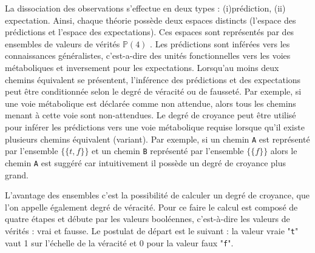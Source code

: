 \begin{refsegment}
La dissociation des observations s'effectue en deux types : (i)prédiction, (ii) expectation. Ainsi, chaque théorie possède deux espaces distincts (l'espace des prédictions et l'espace des expectations). Ces espaces sont représentés par des ensembles de valeurs de vérités $\mathbb{P}(4)$ . Les prédictions sont inférées vers les connaissances généralistes, c'est-a-dire des unités fonctionnelles vers les voies métaboliques et inversement pour les expectations. Lorsqu'au moins deux chemins équivalent se présentent, l'inférence des prédictions et des expectations peut être conditionnée selon le degré de véracité ou de fausseté. Par exemple, si une voie métabolique est déclarée comme non attendue, alors tous les chemins menant à cette voie sont non-attendues. Le degré de croyance peut être utilisé pour inférer les prédictions vers une voie métabolique requise lorsque qu'il existe plusieurs chemins équivalent (variant). Par exemple, si un chemin \texttt{A} est représenté par l'ensemble $\{\{t,f\}\}$ et un chemin  \texttt{B} représenté par l'ensemble $\{\{f\}\}$ alors le chemin \texttt{A} est suggéré  car intuitivement il possède un degré de croyance plus grand.

L'avantage des ensembles c'est la possibilité de calculer un degré de croyance, que l'on appelle également degré de véracité. Pour ce faire le calcul est composé de quatre étapes et débute par les valeurs booléennes, c'est-à-dire les valeurs de vérités : vrai et fausse. Le postulat de départ est le suivant : la valeur vraie "\texttt{t}"  vaut 1 sur l'échelle de la véracité et 0 pour la valeur faux "\texttt{f}".


\end{refsegment}
